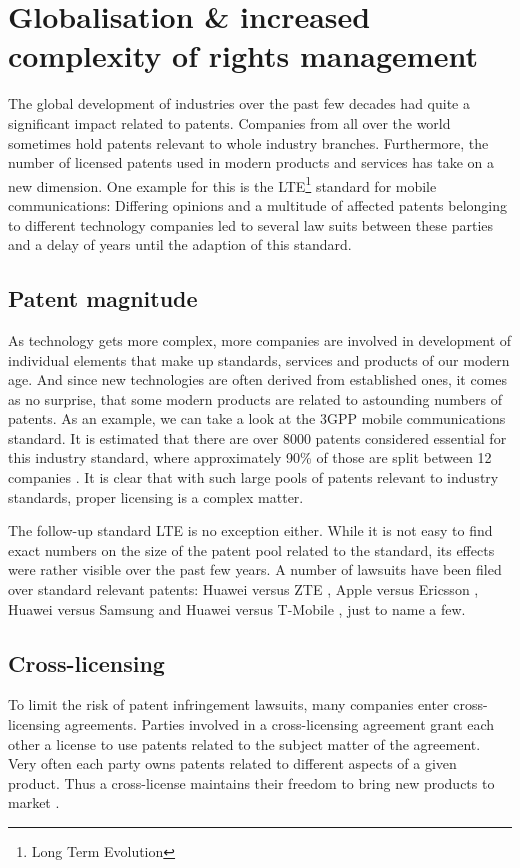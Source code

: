 \documentclass[a4paper]{report}
\begin{document}
\section{Globalisation \& increased complexity of rights management}
\label{sec:GlobalRightsMgmt}
The global development of industries over the past few decades had quite a significant impact related to patents. Companies from all over the world sometimes hold patents relevant to whole industry branches. Furthermore, the number of licensed patents used in modern products and services has take on a new dimension. One example for this is the LTE\footnote{Long Term Evolution} standard for mobile communications: Differing opinions and a multitude of affected patents belonging to different technology companies led to several law suits between these parties and a delay of years until the adaption of this standard.

\subsection{Patent magnitude}
As technology gets more complex, more companies are involved in development of individual elements that make up standards, services and products of our modern age. And since new technologies are often derived from established ones, it comes as no surprise, that some modern products are related to astounding numbers of patents. As an example, we can take a look at the 3GPP mobile communications standard. It is estimated that there are over 8000 patents considered essential for this industry standard, where approximately 90\% of those are split between 12 companies \parencite{Wiki3G}. It is clear that with such large pools of patents relevant to industry standards, proper licensing is a complex matter.

The follow-up standard LTE is no exception either. While it is not easy to find exact numbers on the size of the patent pool related to the standard, its effects were rather visible over the past few years. A number of lawsuits have been filed over standard relevant patents: Huawei versus ZTE \parencite{HuaweiVsZTE}, Apple versus Ericsson \parencite{AppleVsEricsson}, Huawei versus Samsung \parencite{HuaweiVsSamsung} and Huawei versus T-Mobile \parencite{HuaweiVsTmobile}, just to name a few.

\subsection{Cross-licensing}
To limit the risk of patent infringement lawsuits, many companies enter cross-licensing agreements. Parties involved in a cross-licensing agreement grant each other a license to use patents related to the subject matter of the agreement. Very often each party owns patents related to different aspects of a given product. Thus a cross-license maintains their freedom to bring new products to market \parencite{CrossLicense}.
\end{document}
